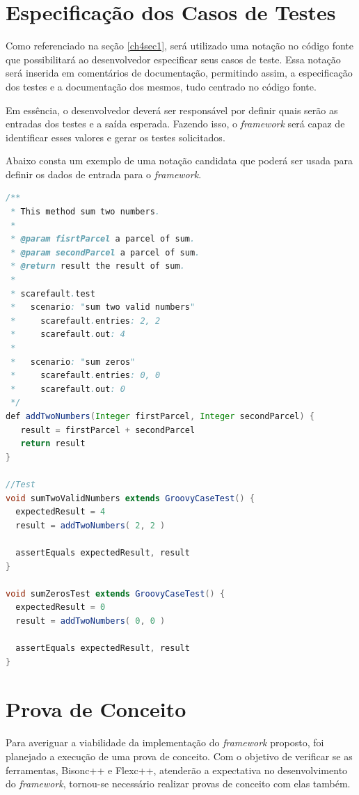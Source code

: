 \section{Especificação dos Casos de Testes}
Como referenciado na seção \ref{ch4sec1}, será utilizado uma notação no código fonte que possibilitará ao desenvolvedor especificar seus casos de teste. Essa notação será inserida em comentários de documentação, permitindo assim, a especificação dos testes e a documentação dos mesmos, tudo centrado no código fonte.
\par
\indent Em essência, o desenvolvedor deverá ser responsável por definir quais serão as entradas dos testes e a saída esperada. Fazendo isso, o \textit{framework} será capaz de identificar esses valores e gerar os testes solicitados.
\par
\indent Abaixo consta um exemplo de uma notação candidata que poderá ser usada para definir os dados de entrada para o \textit{framework}.

\begin{lstlisting}[language=java, label=notacaoCandidata, caption={Notação Candidata}]
/**
 * This method sum two numbers.
 * 
 * @param fisrtParcel a parcel of sum.
 * @param secondParcel a parcel of sum.
 * @return result the result of sum.
 * 
 * scarefault.test
 *   scenario: "sum two valid numbers"
 *     scarefault.entries: 2, 2
 *     scarefault.out: 4
 *
 *   scenario: "sum zeros"
 *     scarefault.entries: 0, 0
 *     scarefault.out: 0
 */
def addTwoNumbers(Integer firstParcel, Integer secondParcel) {
   result = firstParcel + secondParcel
   return result
}

//Test
void sumTwoValidNumbers extends GroovyCaseTest() {
  expectedResult = 4
  result = addTwoNumbers( 2, 2 )
  
  assertEquals expectedResult, result
}

void sumZerosTest extends GroovyCaseTest() {
  expectedResult = 0
  result = addTwoNumbers( 0, 0 )
  
  assertEquals expectedResult, result
}
\end{lstlisting}

\section{Prova de Conceito}

Para averiguar a viabilidade da implementação do \textit{framework} proposto, foi planejado a execução de uma prova de conceito. Com o objetivo de verificar se as ferramentas, Bisonc++ e Flexc++, atenderão a expectativa no desenvolvimento do \textit{framework}, tornou-se necessário realizar provas de conceito com elas também. 

